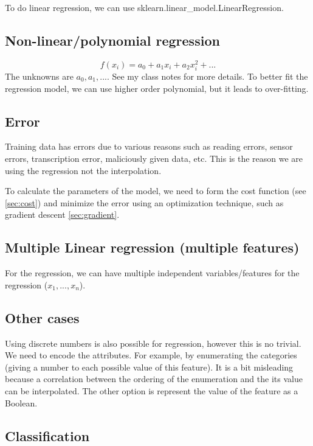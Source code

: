 \documentclass[12pt]{report}
\begin{document}
To do linear regression, we can use sklearn.linear\_model.LinearRegression.

\subsection{Non-linear/polynomial regression}
\begin{equation}
	f(x_i) = a_0 + a_1 x_i + a_2 x_i^2 + ...
\end{equation}
The unknowns are $a_0, a_1, ...$.
See my class notes for more details.
To better fit the regression model, we can use higher order polynomial, but it leads to over-fitting.


\subsection{Error}
Training data has errors due to various reasons such as reading errors, sensor errors, transcription error, maliciously given data, etc. This is the reason we are using the regression not the interpolation.

To calculate the parameters of the model, we need to form the cost function (see \ref{sec:cost}) and minimize the error using an optimization technique, such as gradient descent \ref{sec:gradient}.

\subsection{Multiple Linear regression (multiple features)}

For the regression, we can have multiple independent variables/features for the regression ($x_1, ..., x_n$).




\subsection{Other cases}
Using discrete numbers is also possible for regression, however this is no trivial. We need to encode the attributes. For example, by enumerating the categories (giving a number to each possible value of this feature). It is a bit misleading because a correlation between the ordering of the
enumeration and the its value can be interpolated. The other option is represent the value of the feature as a Boolean.


\subsection{Classification}
\end{document}
